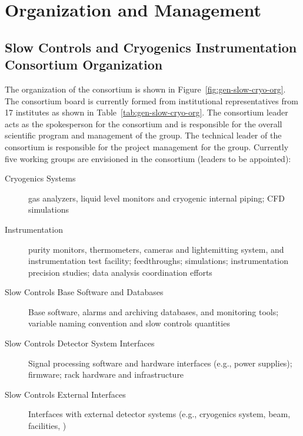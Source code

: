 \section{Organization and Management}
\label{sec:fdgen-slow-cryo-org}

\subsection{Slow Controls and Cryogenics Instrumentation Consortium Organization}
\label{sec:fdgen-slow-cryo-org-consortium}


The organization of the  consortium is shown in
Figure~\ref{fig:gen-slow-cryo-org}. The  consortium board is
currently formed from institutional representatives from \num{17} institutes
as shown in Table~\ref{tab:gen-slow-cryo-org}. The consortium leader
acts as the spokesperson for the consortium and is responsible for the
overall scientific program and management of the group. The technical
leader of the consortium is responsible for the project management for
the group.  Currently five working groups are envisioned in the
consortium (leaders to be appointed):







\begin{description}
 \item[Cryogenics Systems] gas analyzers, liquid level
  monitors and cryogenic internal piping; CFD simulations
 \item[\lar Instrumentation] purity monitors, thermometers,
   cameras and lightemitting system, and instrumentation test facility;
   feedthroughs; \efield simulations;
   instrumentation precision studies;
    data analysis coordination efforts
 \item [Slow Controls Base Software and Databases]  Base software, alarms and archiving databases, and monitoring tools;
   variable naming convention and slow controls quantities
 \item [Slow Controls Detector System Interfaces] Signal processing software and hardware interfaces (e.g., power supplies);
   firmware; rack hardware and infrastructure   
 \item [Slow Controls External Interfaces] Interfaces with external detector systems (e.g., cryogenics system, beam, facilities, )
\end{description}

